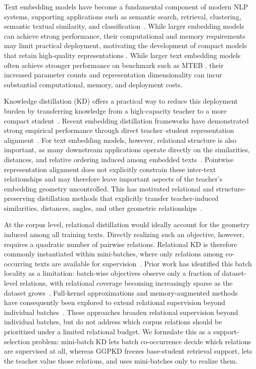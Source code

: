 Text embedding models have become a fundamental component of modern NLP systems, 
supporting applications such as semantic search, retrieval, clustering, semantic 
textual similarity, and classification~\citep{gao2023retrieval,muennighoff2023mteb}. 
While larger embedding models can achieve strong performance, their computational and memory requirements may limit practical deployment, motivating the development of compact models that retain high-quality representations \citep{zhang2025qwen3embedding}. While larger text embedding models often achieve stronger performance on benchmark such as MTEB \citep{muennighoff2023mteb}, their increased parameter counts and representation dimensionality can incur substantial computational, memory, and deployment costs.

Knowledge distillation (KD) offers a practical way to reduce this deployment burden by transferring knowledge from a high-capacity teacher to a more compact student~\citep{hinton2015distilling}. Recent embedding distillation frameworks have demonstrated strong empirical performance through direct teacher--student representation alignment~\citep{vujanic2026leaf}. For text embedding models, however, relational structure is also important, as many downstream applications operate directly on the similarities, distances, and relative ordering induced among embedded texts~\citep{reimers2019sentence,muennighoff2023mteb}. Pointwise representation alignment does not explicitly constrain these inter-text relationships and may therefore leave important aspects of the teacher's embedding geometry uncontrolled. This has motivated relational and structure-preserving distillation methods that explicitly transfer teacher-induced similarities, distances, angles, and other geometric relationships~\citep{tung2019similarity,park2019rkd,kim2023embeddistill,zhang2024jasperstella,dao2026talas}.

At the corpus level, relational distillation would ideally account for the geometry induced among all training texts. Directly realizing such an objective, however, requires a quadratic number of pairwise relations. Relational KD is therefore commonly instantiated within mini-batches, where only relations among co-occurring texts are available for supervision~\citep{tung2019similarity,park2019rkd,passalis2020pkt}. Prior work has identified this batch locality as a limitation: batch-wise objectives observe only a fraction of dataset-level relations, with relational coverage becoming increasingly sparse as the dataset grows~\citep{qian2022fullkernel,ckabert}. Full-kernel approximations and memory-augmented methods have consequently been explored to extend relational supervision beyond individual batches~\citep{qian2022fullkernel,ckabert,yang2022crossimage}. These approaches broaden relational supervision beyond individual batches, but do not address which corpus relations should be prioritized under a limited relational budget. We formulate this as a support-selection problem: mini-batch KD lets batch co-occurrence decide which relations are supervised at all, whereas GGPKD freezes base-student retrieval support, lets the teacher value those relations, and uses mini-batches only to realize them.

